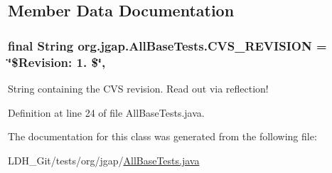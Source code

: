 \subsection{Member Data Documentation}
\hypertarget{classorg_1_1jgap_1_1_all_base_tests_a5d5461b55484bbb0856445ccfed441fa}{
\subsubsection[{C\-V\-S\-\_\-\-R\-E\-V\-I\-S\-I\-O\-N}]{\setlength{\rightskip}{0pt plus 5cm}final String org.\-jgap.\-All\-Base\-Tests.\-C\-V\-S\-\_\-\-R\-E\-V\-I\-S\-I\-O\-N = \char`\"{}\$Revision\-: 1. \$\char`\"{}\hspace{0.3cm}{\ttfamily [static]}, {\ttfamily [private]}}}\label{classorg_1_1jgap_1_1_all_base_tests_a5d5461b55484bbb0856445ccfed441fa}
String containing the C\-V\-S revision. Read out via reflection! 

Definition at line 24 of file All\-Base\-Tests.\-java.



The documentation for this class was generated from the following file\-:\begin{DoxyCompactItemize}
\item 
L\-D\-H\-\_\-\-Git/tests/org/jgap/\hyperlink{_all_base_tests_8java}{All\-Base\-Tests.\-java}\end{DoxyCompactItemize}
